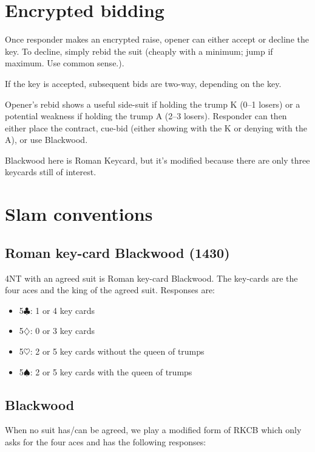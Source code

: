 \documentclass[a4paper,14pt]{extarticle}
\begin{document}
\newpage

\section{Encrypted bidding}
\label{sec:encryption}

Once responder makes an encrypted raise, opener can either accept or decline
the key.  To decline, simply rebid the suit (cheaply with a minimum; jump if
maximum.  Use common sense.).

If the key is accepted, subsequent bids are two-way, depending on the key.

Opener's rebid shows a useful side-suit if holding the trump
K (0--1 losers) or a potential weakness if holding the trump A (2--3 losers).
Responder can then either place the contract, cue-bid (either showing with the
K or denying with the A), or use Blackwood.

Blackwood here is Roman Keycard, but it's modified because there are only three keycards
still of interest.

\section{Slam conventions}
\label{sec:slam}

\subsection{Roman key-card Blackwood (1430)}
\label{sec:rkcb}

4NT with an agreed suit is Roman key-card Blackwood. The key-cards are the four aces
and the king of the agreed suit. Responses are:

\begin{itemize}
\item 5$\clubsuit$: 1 or 4 key cards
\item 5$\diamondsuit$: 0 or 3 key cards
\item 5$\heartsuit$: 2 or 5 key cards without the queen of trumps
\item 5$\spadesuit$: 2 or 5 key cards with the queen of trumps
\end{itemize}

\subsection{Blackwood}
\label{sec:blackwood}

When no suit has/can be agreed, we play a modified form of RKCB which only asks
for the four aces and has the following responses:
\end{document}
